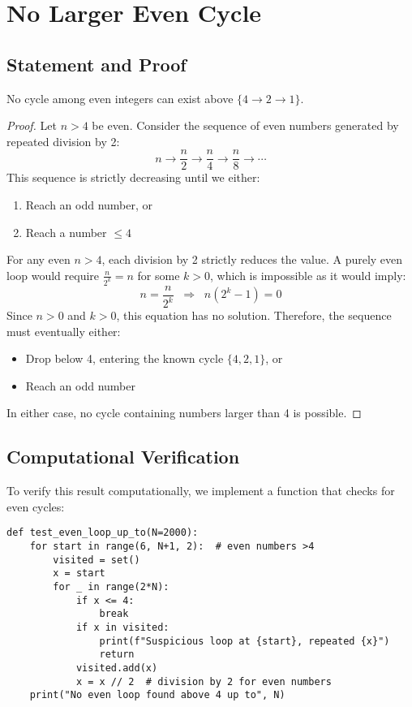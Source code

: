 \section{No Larger Even Cycle}\label{sec:no_even_cycle}

\subsection{Statement and Proof}

\begin{theorem}
No cycle among even integers can exist above $\{4 \to 2 \to 1\}$.
\end{theorem}

\begin{proof}
Let $n > 4$ be even. Consider the sequence of even numbers generated by repeated division by 2:
\[
n \to \frac{n}{2} \to \frac{n}{4} \to \frac{n}{8} \to \cdots
\]
This sequence is strictly decreasing until we either:
\begin{enumerate}
\item Reach an odd number, or
\item Reach a number $\leq 4$
\end{enumerate}

For any even $n > 4$, each division by 2 strictly reduces the value. A purely even loop would require $\frac{n}{2^k} = n$ for some $k > 0$, which is impossible as it would imply:
\[
n = \frac{n}{2^k} \;\;\Rightarrow\;\; n(2^k - 1) = 0
\]
Since $n > 0$ and $k > 0$, this equation has no solution. Therefore, the sequence must eventually either:
\begin{itemize}
\item Drop below 4, entering the known cycle $\{4,2,1\}$, or
\item Reach an odd number
\end{itemize}
In either case, no cycle containing numbers larger than 4 is possible.
\end{proof}

\subsection{Computational Verification}

To verify this result computationally, we implement a function that checks for even cycles:

\begin{lstlisting}[caption=Even Cycle Verification]
def test_even_loop_up_to(N=2000):
    for start in range(6, N+1, 2):  # even numbers >4
        visited = set()
        x = start
        for _ in range(2*N):
            if x <= 4:
                break
            if x in visited:
                print(f"Suspicious loop at {start}, repeated {x}")
                return
            visited.add(x)
            x = x // 2  # division by 2 for even numbers
    print("No even loop found above 4 up to", N)
\end{lstlisting}

